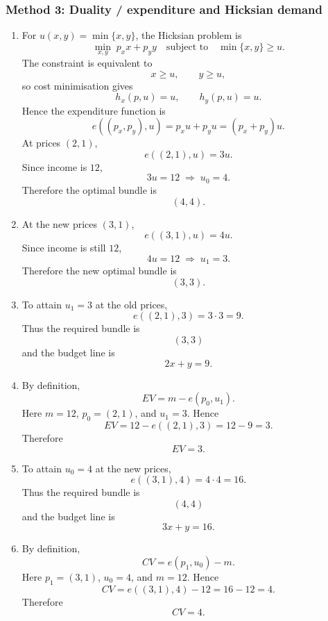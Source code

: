 \documentclass[12pt]{article}
\begin{document}
\subsubsection{Method 3: Duality / expenditure and Hicksian demand}
\begin{enumerate}[label=(\alph*)]
    \item
    For \(u(x,y)=\min\{x,y\}\), the Hicksian problem is
    \[
    \min_{x,y}\; p_xx+p_yy
    \quad\text{subject to}\quad
    \min\{x,y\}\ge u.
    \]
    The constraint is equivalent to
    \[
    x\ge u,\qquad y\ge u,
    \]
    so cost minimisation gives
    \[
    h_x(p,u)=u,\qquad h_y(p,u)=u.
    \]
    Hence the expenditure function is
    \[
    e((p_x,p_y),u)=p_xu+p_yu=(p_x+p_y)u.
    \]
    At prices \((2,1)\),
    \[
    e((2,1),u)=3u.
    \]
    Since income is \(12\),
    \[
    3u=12
    \;\Longrightarrow\;
    u_0=4.
    \]
    Therefore the optimal bundle is
    \[
    \boxed{(4,4)}.
    \]

    \item
    At the new prices \((3,1)\),
    \[
    e((3,1),u)=4u.
    \]
    Since income is still \(12\),
    \[
    4u=12
    \;\Longrightarrow\;
    u_1=3.
    \]
    Therefore the new optimal bundle is
    \[
    \boxed{(3,3)}.
    \]

    \item
    To attain \(u_1=3\) at the old prices,
    \[
    e((2,1),3)=3\cdot 3=9.
    \]
    Thus the required bundle is
    \[
    \boxed{(3,3)}
    \]
    and the budget line is
    \[
    \boxed{2x+y=9.}
    \]

    \item
    By definition,
    \[
    EV=m-e(p_0,u_1).
    \]
    Here \(m=12\), \(p_0=(2,1)\), and \(u_1=3\). Hence
    \[
    EV=12-e((2,1),3)=12-9=3.
    \]
    Therefore
    \[
    \boxed{EV=3.}
    \]

    \item
    To attain \(u_0=4\) at the new prices,
    \[
    e((3,1),4)=4\cdot 4=16.
    \]
    Thus the required bundle is
    \[
    \boxed{(4,4)}
    \]
    and the budget line is
    \[
    \boxed{3x+y=16.}
    \]

    \item
    By definition,
    \[
    CV=e(p_1,u_0)-m.
    \]
    Here \(p_1=(3,1)\), \(u_0=4\), and \(m=12\). Hence
    \[
    CV=e((3,1),4)-12=16-12=4.
    \]
    Therefore
    \[
    \boxed{CV=4.}
    \]
\end{enumerate}

\newpage
\end{document}
